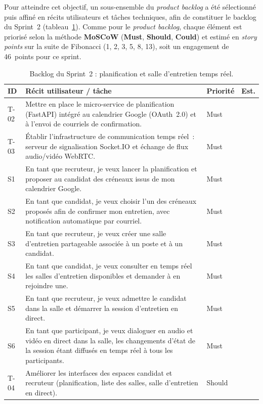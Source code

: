 Pour atteindre cet objectif, un sous-ensemble du \textit{product backlog} a été sélectionné puis affiné en récits utilisateurs et tâches techniques, afin de constituer le backlog du Sprint~2 (tableau~\ref{tab:backlog-s2}). Comme pour le \textit{product backlog}, chaque élément est priorisé selon la méthode \textbf{MoSCoW} (\textbf{Must}, \textbf{Should}, \textbf{Could}) et estimé en \textit{story points} sur la suite de Fibonacci (1, 2, 3, 5, 8, 13), soit un engagement de 46~points pour ce sprint.

\begin{table}[H]
  \centering
  \footnotesize
  \renewcommand{\arraystretch}{1.3}
  \setlength{\tabcolsep}{5pt}
  \begin{tabularx}{\textwidth}{|>{\centering\arraybackslash}p{1.1cm}|>{\raggedright\arraybackslash}X|>{\centering\arraybackslash}p{1.7cm}|>{\centering\arraybackslash}p{0.9cm}|}
    \hline
    \rowcolor{blue!10}
    \textbf{ID} & \textbf{Récit utilisateur / tâche} & \textbf{Priorité} & \textbf{Est.} \\
    \hline
    T-02 & Mettre en place le micro-service de planification (FastAPI) intégré au calendrier Google (OAuth~2.0) et à l'envoi de courriels de confirmation. & Must & 8 \\
    \hline
    T-03 & Établir l'infrastructure de communication temps réel~: serveur de signalisation Socket.IO et échange de flux audio/vidéo WebRTC. & Must & 8 \\
    \hline
    S1 & En tant que recruteur, je veux lancer la planification et proposer au candidat des créneaux issus de mon calendrier Google. & Must & 5 \\
    \hline
    S2 & En tant que candidat, je veux choisir l'un des créneaux proposés afin de confirmer mon entretien, avec notification automatique par courriel. & Must & 3 \\
    \hline
    S3 & En tant que recruteur, je veux créer une salle d'entretien partageable associée à un poste et à un candidat. & Must & 3 \\
    \hline
    S4 & En tant que candidat, je veux consulter en temps réel les salles d'entretien disponibles et demander à en rejoindre une. & Must & 5 \\
    \hline
    S5 & En tant que recruteur, je veux admettre le candidat dans la salle et démarrer la session d'entretien en direct. & Must & 3 \\
    \hline
    S6 & En tant que participant, je veux dialoguer en audio et vidéo en direct dans la salle, les changements d'état de la session étant diffusés en temps réel à tous les participants. & Must & 8 \\
    \hline
    T-04 & Améliorer les interfaces des espaces candidat et recruteur (planification, liste des salles, salle d'entretien en direct). & Should & 3 \\
    \hline
  \end{tabularx}
  \caption{Backlog du Sprint~2 : planification et salle d'entretien temps réel.}
  \label{tab:backlog-s2}
\end{table}

